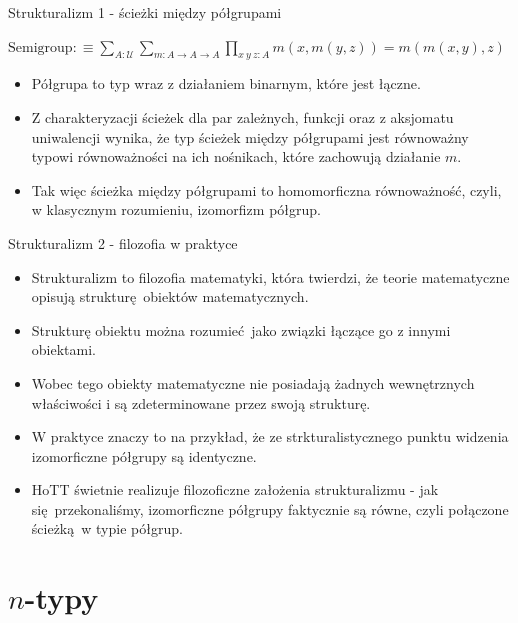 \documentclass{beamer}
\newcommand{\defn}{:\equiv}
\newcommand{\U}{\mathcal{U}}
\begin{document}
\begin{frame}{Strukturalizm 1 - ścieżki między półgrupami}

\begin{definition}[Półgrupa]
$\displaystyle \text{Semigroup} \defn \sum_{A : \U} \sum_{m : A \to A \to A} \prod_{x\ y\ z : A} m(x, m(y, z)) = m(m(x, y), z)$
\end{definition}

\begin{itemize}
	\item Półgrupa to typ wraz z działaniem binarnym, które jest łączne.
	\item Z charakteryzacji ścieżek dla par zależnych, funkcji oraz z aksjomatu uniwalencji wynika, że typ ścieżek między półgrupami jest równoważny typowi równoważności na ich nośnikach, które zachowują działanie $m$.
	\item Tak więc ścieżka między półgrupami to homomorficzna równoważność, czyli, w klasycznym rozumieniu, izomorfizm półgrup.
\end{itemize}

\end{frame}

\begin{frame}{Strukturalizm 2 - filozofia w praktyce}
\begin{itemize}
	\item Strukturalizm to filozofia matematyki, która twierdzi, że teorie matematyczne opisują strukturę obiektów matematycznych.
	\item Strukturę obiektu można rozumieć jako związki łączące go z innymi obiektami.
	\item Wobec tego obiekty matematyczne nie posiadają żadnych wewnętrznych właściwości i są zdeterminowane przez swoją strukturę.
	\item W praktyce znaczy to na przykład, że ze strkturalistycznego punktu widzenia izomorficzne półgrupy są identyczne.
	\item HoTT świetnie realizuje filozoficzne założenia strukturalizmu - jak się przekonaliśmy, izomorficzne półgrupy faktycznie są równe, czyli połączone ścieżką w typie półgrup. 
\end{itemize}

\end{frame}

\section{$n$-typy}
\end{document}
